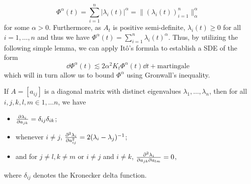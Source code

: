\begin{equation}
  \Phi^{\alpha}(t) = \sum_{i = 1}^n |\lambda_i(t)|^{\alpha} = \|(\lambda_i(t))_{i = 1}^n\|_\alpha^\alpha
\end{equation} 
for some \(\alpha > 0\). Furthermore, as \(A_t\) is positive 
semi-definite, \(\lambda_i(t) \ge 0\) for all \(i = 1, \ldots, n\) and thus we have
\(\Phi^\alpha(t) = \sum_{i = 1}^n \lambda_i(t)^{\alpha}\). Thus, by utilizing the following simple 
lemma, we can apply Itô's formula to establish a SDE of the form 
\[\dd \Phi^\alpha(t) \lesssim 2\alpha^2 K_t \Phi^\alpha(t) \dd t + \text{martingale}\]
which will in turn allow us to bound \(\Phi^\alpha\) using Gronwall's inequality.

\begin{lemma}\label{lem:diff_eig}
  If \(A = [a_{ij}]\) is a diagonal matrix with distinct eigenvalues \(\lambda_1, \ldots, \lambda_n\), then 
  for all \(i, j, k, l, m \in {1, \ldots n}\), we have
  \begin{itemize}
    \item \(\pdv{\lambda_i}{a_{jk}} = \delta_{ij} \delta_{ik}\);
    \item whenever \(i \neq j\), \(\pdv[2]{\lambda_i}{a_{ij}} = 2(\lambda_i - \lambda_j)^{-1}\);
    \item and for \(j \neq l, k \neq m\) or \(i \neq j\) and \(i \neq k\),
      \(\pdv[2]{\lambda_i}{a_{jk}}{a_{lm}} = 0\),
  \end{itemize}
  where \(\delta_{ij}\) denotes the Kronecker delta function.
\end{lemma}

